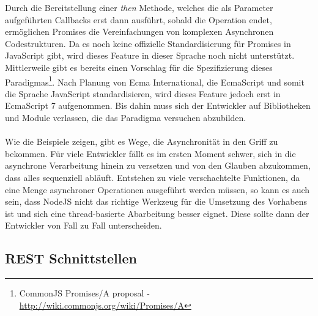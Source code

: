 Durch die Bereitstellung einer \textit{then} Methode, welches die als Parameter aufgeführten Callbacks erst dann ausführt, sobald die Operation endet, ermöglichen Promises die Vereinfachungen von komplexen Asynchronen Codestrukturen. Da es noch keine offizielle Standardisierung für Promises in JavaScript gibt, wird dieses Feature in dieser Sprache noch nicht unterstützt. Mittlerweile gibt es bereits einen Vorschlag für die Spezifizierung dieses Paradigmas\footnote{CommonJS Promises/A proposal - \url{http://wiki.commonjs.org/wiki/Promises/A}}. Nach Planung von Ecma International, die EcmaScript und somit die Sprache JavaScript standardisieren, wird dieses Feature jedoch erst in EcmaScript 7 aufgenommen. Bis dahin muss sich der Entwickler auf Bibliotheken und Module verlassen, die das Paradigma versuchen abzubilden.\\
\\
Wie die Beispiele zeigen, gibt es Wege, die Asynchronität in den Griff zu bekommen. Für viele Entwickler fällt es im ersten Moment schwer, sich in die asynchrone Verarbeitung hinein zu versetzen und von den Glauben abzukommen, dass alles sequenziell abläuft. Entstehen zu viele verschachtelte Funktionen, da eine Menge asynchroner Operationen ausgeführt werden müssen, so kann es auch sein, dass NodeJS nicht das richtige Werkzeug für die Umsetzung des Vorhabens ist und sich eine thread-basierte Abarbeitung besser eignet. Diese sollte dann der Entwickler von Fall zu Fall unterscheiden.

\subsection{REST Schnittstellen}

